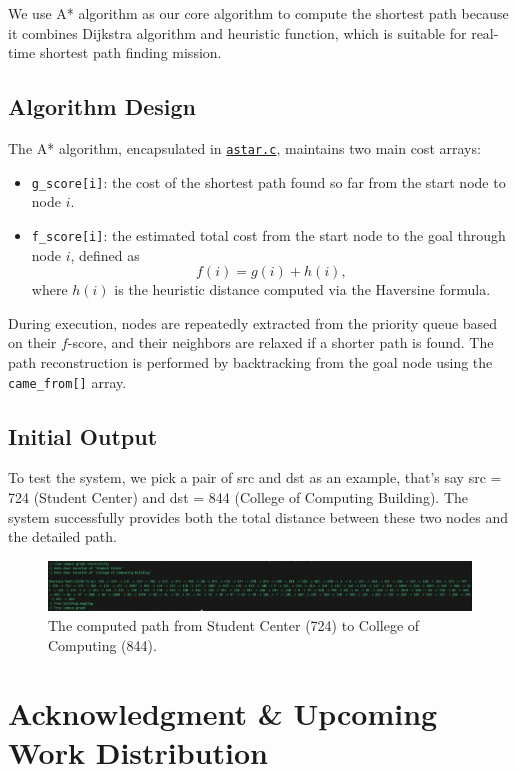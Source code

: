 \documentclass[fleqn,10pt]{olplainarticle}
\begin{document}
We use A* algorithm as our core algorithm to compute the shortest path because it combines Dijkstra algorithm and heuristic function, which is suitable for real-time shortest path finding mission.

\subsection*{Algorithm Design}
The A* algorithm, encapsulated in \href{https://github.com/fredkyang/cse6010-buzznav/blob/main/src/astar.c}{\texttt{astar.c}}, maintains two main cost arrays:
\begin{itemize}
    \item \texttt{g\_score[i]}: the cost of the shortest path found so far from the start node to node $i$.
    \item \texttt{f\_score[i]}: the estimated total cost from the start node to the goal through node $i$, defined as
    \[
    f(i) = g(i) + h(i),
    \]
    where $h(i)$ is the heuristic distance computed via the Haversine formula.
\end{itemize}

During execution, nodes are repeatedly extracted from the priority queue based on their $f$-score, and their neighbors are relaxed if a shorter path is found. The path reconstruction is performed by backtracking from the goal node using the \texttt{came\_from[]} array.

\subsection*{Initial Output}
To test the system, we pick a pair of src and dst as an example, that's say src = 724 (Student Center) and dst = 844 (College of Computing Building). The system successfully provides both the total distance between these two nodes and the detailed path.


\begin{figure}[h]
\centering
\includegraphics[width=1.0\textwidth]{initialResult.jpg}
\caption{The computed path from Student Center (724) to College of Computing (844).}
\end{figure}


\section*{Acknowledgment \& Upcoming Work Distribution}
\end{document}

